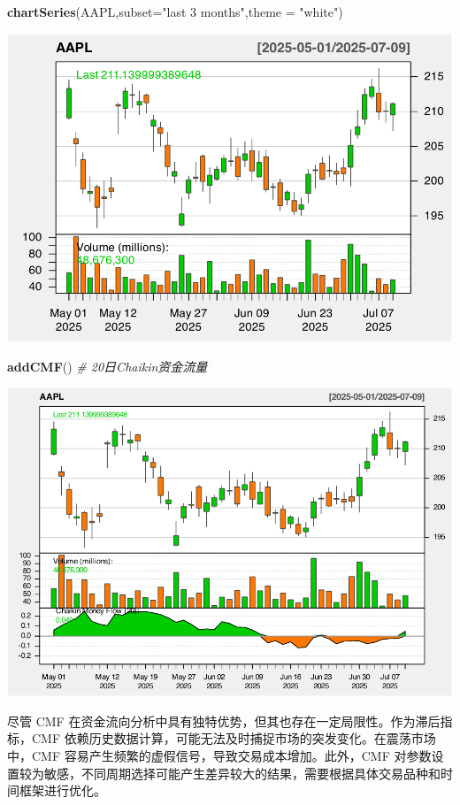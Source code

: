 \documentclass[]{ctexbook}
\newenvironment{Shaded}{\begin{snugshade}}{\end{snugshade}}
\newcommand{\AttributeTok}[1]{\textcolor[rgb]{0.13,0.29,0.53}{#1}}
\newcommand{\CommentTok}[1]{\textcolor[rgb]{0.56,0.35,0.01}{\textit{#1}}}
\newcommand{\FunctionTok}[1]{\textcolor[rgb]{0.13,0.29,0.53}{\textbf{#1}}}
\newcommand{\NormalTok}[1]{#1}
\newcommand{\StringTok}[1]{\textcolor[rgb]{0.31,0.60,0.02}{#1}}
\begin{document}
\begin{Shaded}
\begin{Highlighting}[]
\FunctionTok{chartSeries}\NormalTok{(AAPL,}\AttributeTok{subset=}\StringTok{"last 3 months"}\NormalTok{,}\AttributeTok{theme =} \StringTok{"white"}\NormalTok{)}
\end{Highlighting}
\end{Shaded}

\includegraphics[width=0.9\linewidth]{quantmod_files/figure-latex/cmf-1}

\begin{Shaded}
\begin{Highlighting}[]
\FunctionTok{addCMF}\NormalTok{()  }\CommentTok{\# 20日Chaikin资金流量}
\end{Highlighting}
\end{Shaded}

\includegraphics[width=0.9\linewidth]{quantmod_files/figure-latex/cmf-2}

尽管 CMF 在资金流向分析中具有独特优势，但其也存在一定局限性。作为滞后指标，CMF 依赖历史数据计算，可能无法及时捕捉市场的突发变化。在震荡市场中，CMF 容易产生频繁的虚假信号，导致交易成本增加。此外，CMF 对参数设置较为敏感，不同周期选择可能产生差异较大的结果，需要根据具体交易品种和时间框架进行优化。
\end{document}
